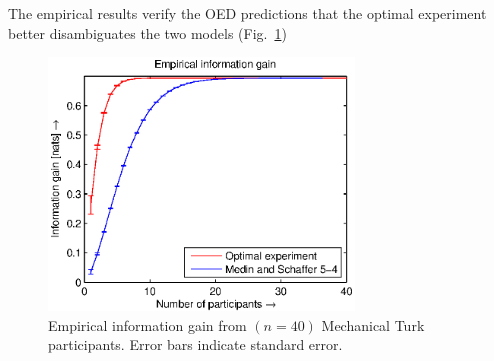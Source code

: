 \documentclass[11pt]{article}
\begin{document}
The empirical results verify the OED predictions that the optimal experiment better disambiguates the two models (Fig.~\ref{fig:empirical})
\begin{figure}[h!]
\centering
\includegraphics[width=3.2in]{img/empirical.eps}
\caption{Empirical information gain from $(n=40)$ Mechanical Turk participants. Error bars indicate standard error.}
\label{fig:empirical}
\end{figure}
\end{document}
